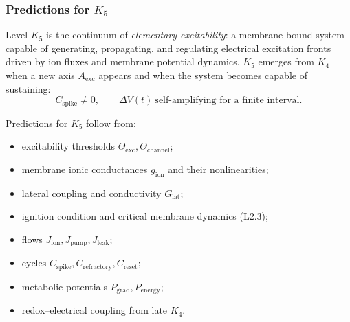 

\subsubsection{Predictions for \texorpdfstring{$K_5$}{K_5}}
\label{sec:predictions-k5}

Level $K_5$ is the continuum of \emph{elementary excitability}: a membrane-bound
system capable of generating, propagating, and regulating electrical
excitation fronts driven by ion fluxes and membrane potential dynamics.
$K_5$ emerges from $K_4$ when a new axis $A_{\mathrm{exc}}$ appears and when
the system becomes capable of sustaining:
\[
C_{\mathrm{spike}} \neq 0,
\qquad
\Delta V(t) \ \text{self-amplifying for a finite interval}.
\]

Predictions for $K_5$ follow from:
\begin{itemize}
    \item excitability thresholds $\Theta_{\mathrm{exc}},\Theta_{\mathrm{channel}}$;
    \item membrane ionic conductances $g_{\mathrm{ion}}$ and their nonlinearities;
    \item lateral coupling and conductivity $G_{\mathrm{lat}}$;
    \item ignition condition and critical membrane dynamics (L2.3);
    \item flows $J_{\mathrm{ion}},J_{\mathrm{pump}},J_{\mathrm{leak}}$;
    \item cycles $C_{\mathrm{spike}},C_{\mathrm{refractory}},C_{\mathrm{reset}}$;
    \item metabolic potentials $P_{\mathrm{grad}},P_{\mathrm{energy}}$;
    \item redox–electrical coupling from late $K_4$.
\end{itemize}

